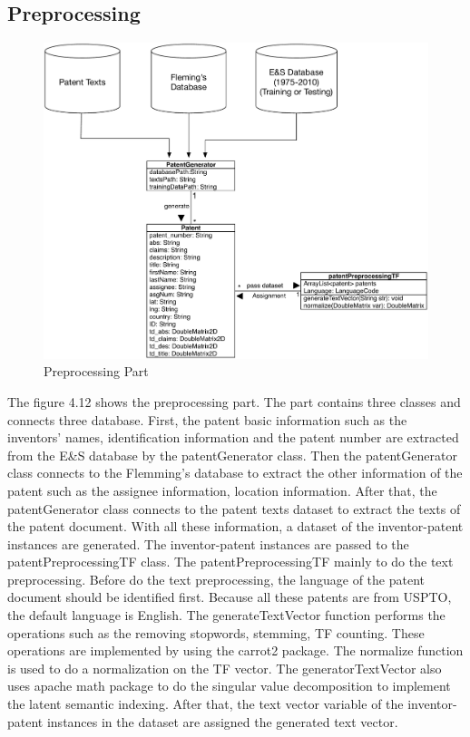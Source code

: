 \subsection{Preprocessing}
\begin{figure}
\centering
\includegraphics[scale=0.65]{preProcessing.pdf}
\caption{Preprocessing Part}
\end{figure}
The figure 4.12 shows the preprocessing part. The part contains three classes and connects three database. First, the patent basic information such as the inventors' names, identification information and the patent number are extracted from the E\&S database by the patentGenerator class. Then the patentGenerator class connects to the Flemming's database to extract the other information of the patent such as the assignee information, location information. After that, the patentGenerator class connects to the patent texts dataset to extract the texts of the patent document. With all these information, a dataset of the inventor-patent instances are generated. The inventor-patent instances are passed to the patentPreprocessingTF class. The patentPreprocessingTF mainly to do the text preprocessing.  Before do the text preprocessing, the language of the patent document should be identified first. Because all these patents are from USPTO, the default language is English. The generateTextVector function performs the operations such as the removing stopwords, stemming, TF counting. These operations are implemented by using the carrot2 package. The normalize function is used to do a normalization on the TF vector. The generatorTextVector also uses apache math package to do the singular value decomposition to implement the latent semantic indexing. After that, the text  vector variable of the inventor-patent instances in the dataset are assigned the generated text vector.

